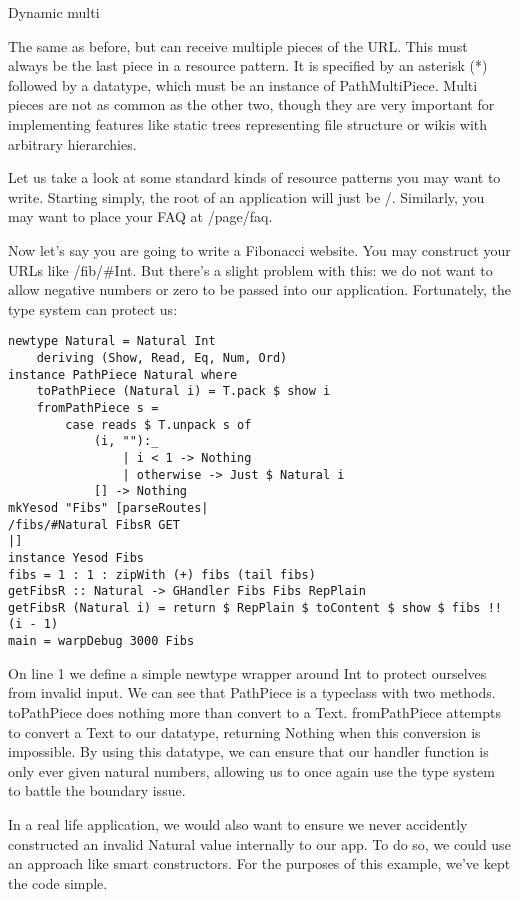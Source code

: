Dynamic multi

The same as before, but can receive multiple pieces of the URL. This
must always be the last piece in a resource pattern. It is specified
by an asterisk (*) followed by a datatype, which must be an instance
of PathMultiPiece. Multi pieces are not as common as the other two,
though they are very important for implementing features like static
trees representing file structure or wikis with arbitrary
hierarchies.

Let us take a look at some standard kinds of resource patterns you may
want to write. Starting simply, the root of an application will just
be /. Similarly, you may want to place your FAQ at /page/faq.

Now let's say you are going to write a Fibonacci website. You may
construct your URLs like /fib/\#Int. But there's a slight problem with
this: we do not want to allow negative numbers or zero to be passed
into our application. Fortunately, the type system can protect us:

\begin{lstlisting}
newtype Natural = Natural Int
    deriving (Show, Read, Eq, Num, Ord)
instance PathPiece Natural where
    toPathPiece (Natural i) = T.pack $ show i
    fromPathPiece s =
        case reads $ T.unpack s of
            (i, ""):_
                | i < 1 -> Nothing
                | otherwise -> Just $ Natural i
            [] -> Nothing
mkYesod "Fibs" [parseRoutes|
/fibs/#Natural FibsR GET
|]
instance Yesod Fibs
fibs = 1 : 1 : zipWith (+) fibs (tail fibs)
getFibsR :: Natural -> GHandler Fibs Fibs RepPlain
getFibsR (Natural i) = return $ RepPlain $ toContent $ show $ fibs !! (i - 1)
main = warpDebug 3000 Fibs
\end{lstlisting}

On line 1 we define a simple newtype wrapper around Int to protect
ourselves from invalid input. We can see that PathPiece is a typeclass
with two methods. toPathPiece does nothing more than convert to a
Text. fromPathPiece attempts to convert a Text to our datatype,
returning Nothing when this conversion is impossible. By using this
datatype, we can ensure that our handler function is only ever given
natural numbers, allowing us to once again use the type system to
battle the boundary issue.

In a real life application, we would also want to ensure we never
accidently constructed an invalid Natural value internally to our
app. To do so, we could use an approach like smart constructors. For
the purposes of this example, we've kept the code simple.

